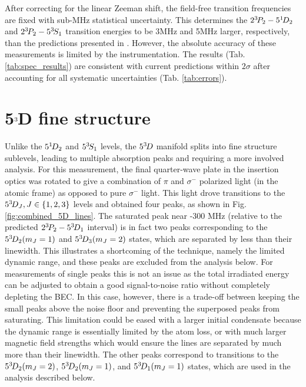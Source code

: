 	After correcting for the linear Zeeman shift, the field-free transition frequencies are fixed with sub-MHz statistical uncertainty.
	This determines the $2^{3\!} P_2-5^{1\!} D_2$ and $2^{3\!} P_2-5^{3\!} S_1$ transition energies to be 3MHz and 5MHz larger, respectively, than the predictions presented in \cite{Drake07}.
	However, the absolute accuracy of these measurements is limited by the instrumentation.
	The results (Tab.	\ref{tab:spec_results}) are consistent with current predictions \cite{Drake07} within $2\sigma$ after accounting for all systematic uncertainties (Tab.	\ref{tab:errors}).
\section{5$^{3\!}$D fine structure}

	Unlike the $5^{1\!} D_2$ and $5^{3\!} S_1$ levels, the $5^{3\!} D$ manifold splits into fine structure sublevels, leading to multiple absorption peaks and requiring a more involved analysis.
	For this measurement, the final quarter-wave plate in the insertion optics was rotated to give a combination of $\pi$ and $\sigma^-$ polarized light (in the atomic frame) as opposed to pure $\sigma^-$ light.
	This light drove transitions to the $5^{3\!} D_J, J\in\{1,2,3\}$ levels and obtained four peaks, as shown in Fig.	\ref{fig:combined_5D_lines}.
	The saturated peak near -300 MHz (relative to the predicted $2^{3\!} P_2 - 5^{3\!} D_1$ interval) is in fact two peaks corresponding to the $5^{3\!} D_2(m_J=1)$ and $5^{3\!} D_3(m_J=2)$ states, which are separated by less than their linewidth. 
	This illustrates a shortcoming of the technique, namely the limited dynamic range, and these peaks are excluded from the analysis below.
	For measurements of single peaks this is not an issue as the total irradiated energy can be adjusted to obtain a good signal-to-noise ratio without completely depleting the BEC.
	In this case, however, there is a trade-off between keeping the small peaks above the noise floor and preventing the superposed peaks from saturating.
	This limitation could be eased with a larger initial condensate because the dynamic range is essentially limited by the atom loss, or with much larger magnetic field strengths which would ensure the lines are separated by much more than their linewidth.
	The other peaks correspond to transitions to the $5^{3\!} D_2(m_J=2)$, $5^{3\!} D_2(m_J=1)$, and $5^{3\!} D_1(m_J=1)$ states, which are used in the analysis described below.

